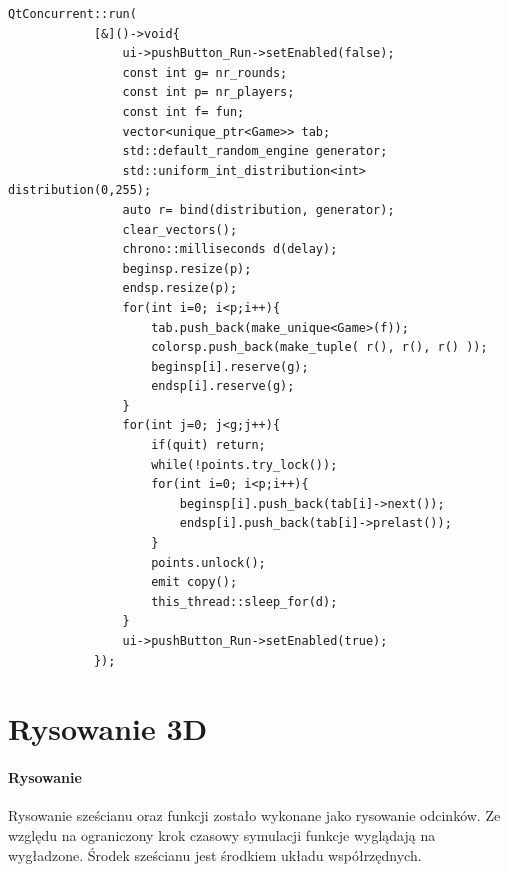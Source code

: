 \begin{lstlisting}
QtConcurrent::run(
            [&]()->void{
                ui->pushButton_Run->setEnabled(false);
                const int g= nr_rounds;
                const int p= nr_players;
                const int f= fun;
                vector<unique_ptr<Game>> tab;
                std::default_random_engine generator;
                std::uniform_int_distribution<int> distribution(0,255);
                auto r= bind(distribution, generator);
                clear_vectors();
                chrono::milliseconds d(delay);
                beginsp.resize(p);
                endsp.resize(p);
                for(int i=0; i<p;i++){
                    tab.push_back(make_unique<Game>(f));
                    colorsp.push_back(make_tuple( r(), r(), r() ));
                    beginsp[i].reserve(g);
                    endsp[i].reserve(g);
                }
                for(int j=0; j<g;j++){
                    if(quit) return;
                    while(!points.try_lock());
                    for(int i=0; i<p;i++){
                        beginsp[i].push_back(tab[i]->next());
                        endsp[i].push_back(tab[i]->prelast());
                    }
                    points.unlock();
                    emit copy();
                    this_thread::sleep_for(d);
                }
                ui->pushButton_Run->setEnabled(true);
            });
\end{lstlisting}


\section{Rysowanie 3D}
\label{sec::3d}
\paragraph{Rysowanie}
Rysowanie sześcianu oraz funkcji zostało wykonane jako rysowanie odcinków. Ze względu na ograniczony krok czasowy symulacji funkcje wyglądają na wygładzone. Środek sześcianu jest środkiem układu współrzędnych.
